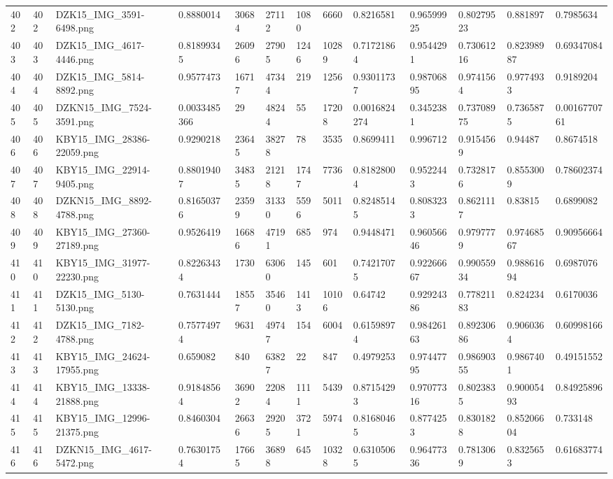 \documentclass[11pt, a4paper, twoside]{report}
\begin{document}
\begin{longtable}[c]{@{}lllllllllllll@{}}
402 & 402 & DZK15\_IMG\_3591-6498.png & 0.8880014 & 30684 & 27112 & 1080 & 6660 & 0.8216581 & 0.96599925 & 0.80279523 & 0.881897 & 0.7985634 \\
403 & 403 & DZK15\_IMG\_4617-4446.png & 0.81899345 & 26096 & 27905 & 1246 & 10289 & 0.71721864 & 0.9544291 & 0.73061216 & 0.82398987 & 0.69347084 \\
404 & 404 & DZK15\_IMG\_5814-8892.png & 0.9577473 & 16717 & 47344 & 219 & 1256 & 0.93011737 & 0.98706895 & 0.9741564 & 0.9774933 & 0.9189204 \\
405 & 405 & DZKN15\_IMG\_7524-3591.png & 0.0033485366 & 29 & 48244 & 55 & 17208 & 0.0016824274 & 0.3452381 & 0.73708975 & 0.7365875 & 0.0016770761 \\
406 & 406 & KBY15\_IMG\_28386-22059.png & 0.9290218 & 23645 & 38278 & 78 & 3535 & 0.8699411 & 0.996712 & 0.9154569 & 0.94487 & 0.8674518 \\
407 & 407 & KBY15\_IMG\_22914-9405.png & 0.88019407 & 34835 & 21218 & 1747 & 7736 & 0.81828004 & 0.9522443 & 0.7328176 & 0.8553009 & 0.78602374 \\
408 & 408 & DZKN15\_IMG\_8892-4788.png & 0.81650376 & 23599 & 31330 & 5596 & 5011 & 0.82485145 & 0.8083233 & 0.8621117 & 0.83815 & 0.6899082 \\
409 & 409 & KBY15\_IMG\_27360-27189.png & 0.9526419 & 16686 & 47191 & 685 & 974 & 0.9448471 & 0.96056646 & 0.9797779 & 0.97468567 & 0.90956664 \\
410 & 410 & KBY15\_IMG\_31977-22230.png & 0.82263434 & 1730 & 63060 & 145 & 601 & 0.74217075 & 0.92266667 & 0.99055934 & 0.98861694 & 0.6987076 \\
411 & 411 & DZK15\_IMG\_5130-5130.png & 0.7631444 & 18557 & 35460 & 1413 & 10106 & 0.64742 & 0.92924386 & 0.77821183 & 0.824234 & 0.6170036 \\
412 & 412 & DZK15\_IMG\_7182-4788.png & 0.75774974 & 9631 & 49747 & 154 & 6004 & 0.61598974 & 0.98426163 & 0.89230686 & 0.9060364 & 0.60998166 \\
413 & 413 & KBY15\_IMG\_24624-17955.png & 0.659082 & 840 & 63827 & 22 & 847 & 0.4979253 & 0.97447795 & 0.98690355 & 0.9867401 & 0.49151552 \\
414 & 414 & KBY15\_IMG\_13338-21888.png & 0.91848564 & 36902 & 22084 & 1111 & 5439 & 0.87154293 & 0.97077316 & 0.8023835 & 0.90005493 & 0.84925896 \\
415 & 415 & KBY15\_IMG\_12996-21375.png & 0.8460304 & 26636 & 29205 & 3721 & 5974 & 0.81680465 & 0.8774253 & 0.8301828 & 0.85206604 & 0.733148 \\
416 & 416 & DZKN15\_IMG\_4617-5472.png & 0.76301754 & 17665 & 36898 & 645 & 10328 & 0.63105065 & 0.96477336 & 0.7813069 & 0.8325653 & 0.61683774 \\

\end{longtable}
\end{document}
